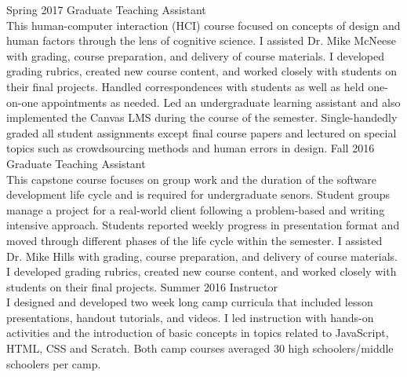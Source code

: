 \documentclass[]{cv-style}          %
\begin{document}
\begin{entrylist}
{  }
\entry
  {Spring 2017}
  {Graduate Teaching Assistant}
  {}
  {\\ 
  This human-computer interaction (HCI) course focused on concepts of design and human factors through the lens of cognitive science. I assisted Dr. Mike McNeese with grading, course preparation, and delivery of course materials. I developed grading rubrics, created new course content, and worked closely with students on their final projects. Handled correspondences with students as well as held one-on-one appointments as needed. Led an undergraduate learning assistant and also implemented the Canvas LMS during the course of the semester. Single-handedly graded all student assignments except final course papers and lectured on special topics such as crowdsourcing methods and human errors in design.
  }
\entry
  {Fall 2016}
  {Graduate Teaching Assistant}
  {}
  {\\ 
  This capstone course focuses on group work and the duration of the software development life cycle and is required for undergraduate senors. Student groups manage a project for a real-world client following a problem-based and writing intensive approach. Students reported weekly progress in presentation format and moved through different phases of the life cycle within the semester. I assisted Dr. Mike Hills with grading, course preparation, and delivery of course materials. I developed grading rubrics, created new course content, and worked closely with students on their final projects. 
  }
\entry
  {Summer 2016}
  {Instructor}
  {}
  {\\ 
  I designed and developed two week long camp curricula that included lesson presentations, handout tutorials, and videos. I led instruction with hands-on activities and the introduction of basic concepts in topics related to JavaScript, HTML, CSS and Scratch. Both camp courses averaged 30 high schoolers/middle schoolers per camp. 
}
\end{entrylist}
\end{document}
